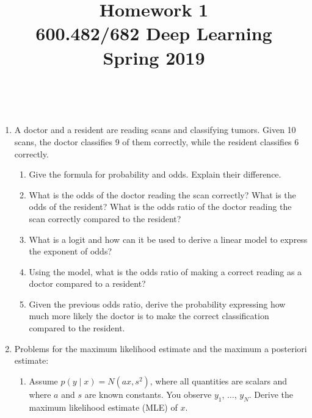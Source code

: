 \documentclass[a4paper]{article}
\title{Homework 1\\
600.482/682 Deep Learning\\
Spring 2019}
\author{\bf{}}
\begin{document}
\maketitle

\\

\vspace{5mm}

\begin{enumerate}
\item	A doctor and a resident are reading scans and classifying tumors. Given 10 scans, the doctor classifies 9 of them correctly, while the resident classifies 6 correctly. 

\begin{enumerate}
	\item	Give the formula for probability and odds. Explain their difference. 
	
	\item What is the odds of the doctor reading the scan correctly? What is the odds of the resident? What is the odds ratio of the doctor reading the scan correctly compared to the resident?
	
	\item What is a logit and how can it be used to derive a linear model to express the exponent of odds?
	
	\item Using the model, what is the odds ratio of making a correct reading as a doctor compared to a resident?
	
	\item Given the previous odds ratio, derive the probability expressing how much more likely the doctor is to make the correct classification compared to the resident. 
\end{enumerate}

\item Problems for the maximum likelihood estimate and the maximum a posteriori estimate:
\begin{enumerate}
\item Assume $p(y \mid x) = N(ax, s^2)$, where all quantities are scalars and where $a$ and $s$ are known constants. You observe $y_1$, $\ldots$, $y_N$. Derive the maximum likelihood estimate  (MLE) of $x$.\\


\end{enumerate}
\end{enumerate}
\end{document}
